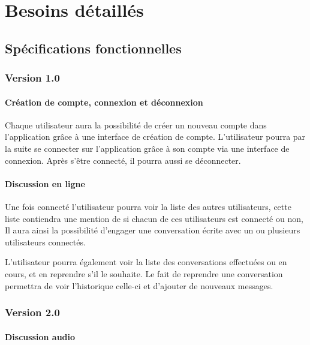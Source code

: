 \section{Besoins détaillés}

\subsection{Spécifications fonctionnelles}

\subsubsection{Version 1.0}

\paragraph{Création de compte, connexion et déconnexion\newline} 

\par Chaque utilisateur aura la possibilité de créer un nouveau compte dans l’application grâce à une interface de création de compte. L’utilisateur pourra par la suite se connecter sur l’application grâce à son compte via une interface de connexion. Après s'être connecté, il pourra aussi se déconnecter. 


\paragraph{Discussion en ligne\newline} 

\par Une fois connecté l'utilisateur pourra voir la liste des autres utilisateurs, cette liste contiendra une mention de si chacun de ces utilisateurs est connecté ou non, Il aura ainsi la possibilité d’engager une conversation écrite avec un ou plusieurs utilisateurs connectés. 

\par L’utilisateur pourra également voir la liste des conversations effectuées ou en cours, et en reprendre s'il le souhaite. Le fait de reprendre une conversation permettra de voir l’historique celle-ci et d’ajouter de nouveaux messages. 

\subsubsection{Version 2.0}

\paragraph{Discussion audio\newline}


